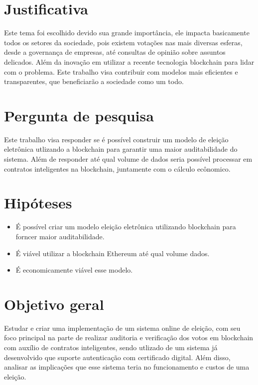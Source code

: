 \documentclass{ufsctex/ufsctex}
\begin{document}
\section{Justificativa}

Este tema foi escolhido devido sua grande importância, ele impacta basicamente
todos os setores da sociedade, pois existem votações nas mais diversas esferas,
desde a governança de empresas, até consultas de opinião sobre assuntos delicados.
Além da inovação em utilizar a recente tecnologia blockchain para lidar com o problema.
Este trabalho visa contribuir com modelos mais eficientes e transparentes, que
beneficiarão a sociedade como um todo.

\section{Pergunta de pesquisa}

Este trabalho visa responder se é possível construir um modelo de eleição
eletrônica utlizando a blockchain para garantir uma maior auditabilidade
do sistema. Além de responder até qual volume de dados seria possível processar
em contratos inteligentes na blockchain, juntamente com o cálculo ecônomico.

\section{Hipóteses}

\begin{itemize}
	\item É possível criar um modelo eleição eletrônica utilizando blockchain
		para forncer maior auditabilidade.
	\item É viável utilizar a blockchain Ethereum até qual volume dados.
	\item É economicamente viável esse modelo.
\end{itemize}

\section{Objetivo geral}

Estudar e criar uma implementação de um sistema online de eleição, com seu foco
principal na parte de realizar auditoria e verificação dos votos em blockchain
com auxílio de contratos inteligentes, sendo utlizado de um sistema já desenvolvido
que suporte autenticação com certificado digital. Além disso, analisar as implicações
que esse sistema teria no funcionamento e custos de uma eleição. \\
\end{document}
